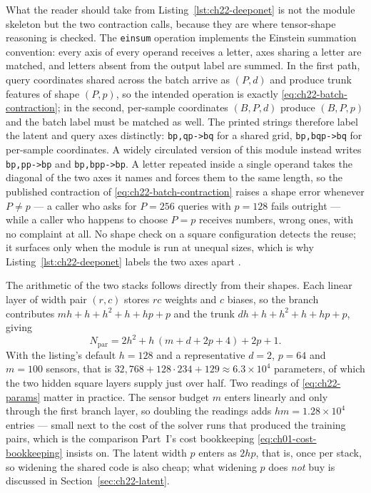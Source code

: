 What the reader should take from Listing~\ref{lst:ch22-deeponet} is not the module skeleton but
the two contraction calls, because they are where tensor-shape reasoning is checked. The
\texttt{einsum} operation implements the Einstein summation convention: every axis of every
operand receives a letter, axes sharing a letter are matched, and letters absent from the
output label are summed.
In the first path, query coordinates shared across the batch arrive as $(P, d)$ and produce
trunk features of shape $(P, p)$, so the intended operation is exactly
\eqref{eq:ch22-batch-contraction}; in the second, per-sample coordinates $(B, P, d)$ produce
$(B, P, p)$ and the batch label must be matched as well. The printed strings therefore label
the latent and query axes distinctly: \texttt{bp,qp->bq} for a shared grid,
\texttt{bp,bqp->bq} for per-sample coordinates. A widely circulated version of this module
instead writes \texttt{bp,pp->bp} and \texttt{bp,bpp->bp}. A letter repeated inside a
single operand takes the diagonal of the two axes it names and forces them to the same
length, so the published contraction of
\eqref{eq:ch22-batch-contraction} raises a shape error whenever $P \ne p$ --- a caller who
asks for $P = 256$ queries with $p = 128$ fails outright --- while a caller who happens to
choose $P = p$ receives numbers, wrong ones, with no complaint at all. No shape check on a
square configuration detects the reuse; it surfaces only when the module is run at
unequal sizes, which is why Listing~\ref{lst:ch22-deeponet} labels the two axes apart
.

The arithmetic of the two stacks follows directly from their shapes. Each linear layer of
width pair $(r, c)$ stores $rc$ weights and $c$ biases, so the branch contributes
$mh + h + h^{2} + h + hp + p$ and the trunk $dh + h + h^{2} + h + hp + p$, giving
\begin{equation}
  \label{eq:ch22-params}
  N_{\mathrm{par}} = 2h^{2} + h\,(m + d + 2p + 4) + 2p + 1 .
\end{equation}
With the listing's default $h = 128$ and a representative $d = 2$, $p = 64$ and $m = 100$
sensors, that is
$32{,}768 + 128 \cdot 234 + 129 \approx 6.3 \times 10^{4}$ parameters, of which the two hidden
square layers supply just over half. Two readings of \eqref{eq:ch22-params} matter in practice.
The sensor budget $m$ enters linearly and only through the first branch layer, so doubling the
readings adds $hm = 1.28 \times 10^{4}$ entries --- small next to the cost of the solver runs
that produced the training pairs, which is the comparison Part~I's cost bookkeeping
\eqref{eq:ch01-cost-bookkeeping} insists on. The latent width $p$ enters as $2hp$, that is, once per
stack, so widening the shared code is also cheap; what widening $p$ does \emph{not} buy is
discussed in Section~\ref{sec:ch22-latent}.

